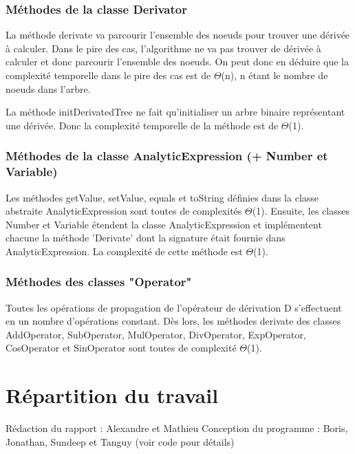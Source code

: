 \documentclass[11pt]{article}
\begin{document}
\subsubsection*{Méthodes de la classe Derivator}
La méthode derivate va parcourir l'ensemble des noeuds pour trouver une dérivée à calculer. Dans le pire des cas, l'algorithme ne va pas trouver de dérivée à calculer et donc parcourir l'ensemble des noeuds. On peut donc en déduire que la complexité temporelle dans le pire des cas est de $\Theta$(n), n étant le nombre de noeuds dans l'arbre.

La méthode initDerivatedTree ne fait qu'initialiser un arbre binaire représentant une dérivée. Donc la complexité temporelle de la méthode est de $\Theta$(1).

\subsubsection*{Méthodes de la classe AnalyticExpression (+ Number et Variable)}
Les méthodes getValue, setValue, equals et toString définies dans la classe abstraite AnalyticExpression sont toutes de complexités $\Theta$(1). Ensuite, les classes Number et Variable étendent la classe AnalyticExpression et implémentent chacune la méthode 'Derivate' dont la signature était fournie dans AnalyticExpression. La complexité de cette méthode est $\Theta$(1).

\subsubsection*{Méthodes des classes "Operator"}
Toutes les opérations de propagation de l'opérateur de dérivation D s'effectuent en un nombre d'opérations constant. Dès lors, les méthodes derivate des classes AddOperator, SubOperator, MulOperator, DivOperator, ExpOperator, CosOperator et SinOperator sont toutes de complexité $\Theta$(1).

\section{Répartition du travail}

Rédaction du rapport : Alexandre et Mathieu
Conception du programme : Boris, Jonathan, Sundeep et Tanguy (voir code pour détails)
\end{document}
